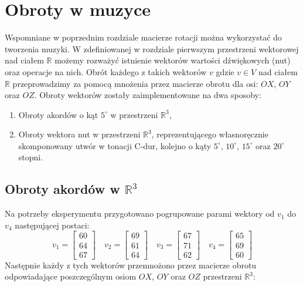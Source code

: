 \chapter{Obroty w muzyce}

Wspomniane w poprzednim rozdziale macierze rotacji można wykorzystać do tworzenia muzyki.
W zdefiniowanej w rozdziale pierwszym przestrzeni wektorowej nad ciałem $\mathbb{R}$ możemy rozważyć istnienie  wektorów wartości dźwiękowych (nut) oraz operacje na nich.
Obrót każdego z takich wektorów $v$ gdzie $v \in V$ nad ciałem $\mathbb{R}$ przeprowadzimy za pomocą mnożenia przez macierze obrotu dla osi: $OX$, $OY$ oraz $OZ$. Obroty wektorów zostały zaimplementowane na dwa sposoby:
\begin{enumerate}
    \item Obroty akordów o kąt $5^{\circ}$ w przestrzeni $\mathbb{R}^{3}$,
    \item Obroty wektora nut w przestrzeni $\mathbb{R}^{3}$, reprezentującego własnoręcznie skomponowany utwór w tonacji C-dur, kolejno o kąty $5^{\circ}$, $10^{\circ}$, $15^{\circ}$ oraz $20^{\circ}$ stopni.
\end{enumerate}

\section{Obroty akordów w \texorpdfstring{$\mathbb{R}^{3}$}{R3}}
Na potrzeby eksperymentu przygotowano pogrupowane parami wektory od $v_{1}$ do $v_{4}$ następującej postaci:
\begin{equation*}
v_{1} =
    \begin{bmatrix}
     60 \\
     64 \\
     67
    \end{bmatrix}
    \quad
    v_{2} =
    \begin{bmatrix}
     69 \\
     61 \\
     64
    \end{bmatrix}
    \quad
    v_{3} =
    \begin{bmatrix}
     67 \\
     71 \\
     62
    \end{bmatrix}
    \quad
    v_{4} =
    \begin{bmatrix}
     65 \\
     69 \\
     60
    \end{bmatrix}
\end{equation*}
Następnie każdy z tych wektorów przemnożono przez macierze obrotu odpowiadające poszczególnym osiom $OX$, $OY$ oraz $OZ$ przestrzeni $\mathbb{R}^{3}$:

